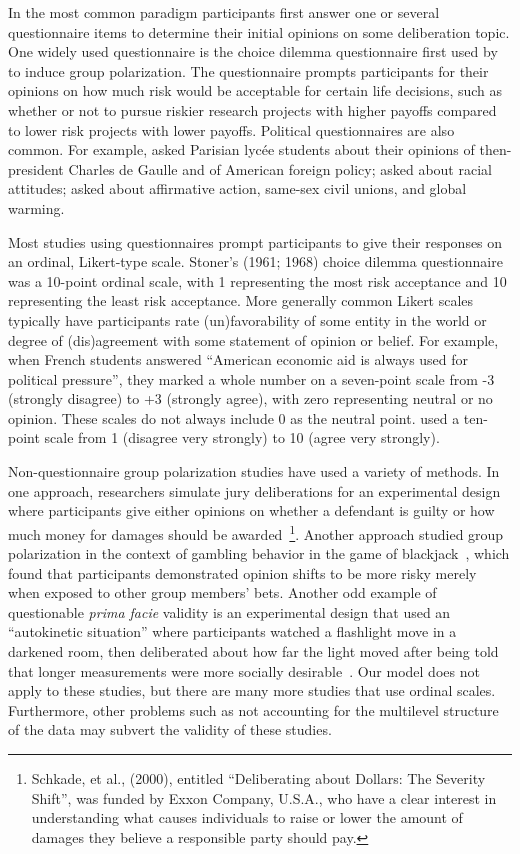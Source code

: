 In the most common paradigm participants first answer one or
several questionnaire items to determine their initial opinions on some 
deliberation topic. One widely used questionnaire is the choice dilemma
questionnaire first used by~ to induce group polarization.
The questionnaire prompts participants for their opinions on how much risk would be 
acceptable for certain life decisions, such as whether or not to pursue
riskier research projects with higher payoffs compared to lower risk projects
with lower payoffs. Political questionnaires are also common. For example,
 asked Parisian lycée students about their 
opinions of then-president
Charles de Gaulle and of American foreign policy;  asked about
racial attitudes;  asked about affirmative action, 
same-sex civil unions, and global warming. 

Most studies using questionnaires
prompt participants to give their responses on an ordinal, Likert-type scale.
Stoner's (1961; 1968) choice dilemma questionnaire was a 10-point ordinal
scale, with 1 representing the most risk acceptance and 10 representing the
least risk acceptance.  More generally common Likert scales typically 
have participants rate (un)favorability of some entity
in the world or degree of (dis)agreement with some statement of opinion or
belief. For example, when French students answered ``American economic aid
is always used for political pressure'', they marked a whole number on
a seven-point scale from
-3 (strongly disagree) to +3 (strongly agree), with zero representing 
neutral or no opinion. These scales do not always include 0 as the neutral
point.  used a ten-point scale from 1 (disagree very strongly)
to 10 (agree very strongly).

Non-questionnaire group polarization studies have used a variety of 
methods. In one approach, researchers simulate jury deliberations
for an experimental design where participants give either opinions
on whether a defendant is guilty or how much money for damages should be
awarded~\cite{Kaplan1977,Kaplan1977a,Schkade2000,Schkade2007,Sunstein2000}\footnote{
Schkade, et al., (2000), entitled ``Deliberating about Dollars: The Severity Shift'',
was funded by Exxon Company, U.S.A., who have a clear interest in understanding
what causes individuals to raise or lower the amount of damages they believe
a responsible party should pay.}. Another approach studied group
polarization in the context of gambling behavior in the game of 
blackjack~\cite{Blascovich1974,Blascovich1975,Blascovich1976}, which
found that participants demonstrated opinion shifts to be more risky merely
when exposed to other group members' bets. Another odd example of questionable
\emph{prima facie} validity is an
experimental design that used an ``autokinetic situation'' where participants
watched a flashlight move in a darkened room, then deliberated about how
far the light moved after being told that longer measurements were more socially
desirable~\cite{Baron1976}. Our model does not apply to these studies, but there
are many more studies that use ordinal scales. Furthermore, other problems
such as not accounting for the multilevel structure of the data may 
subvert the validity of these studies.


